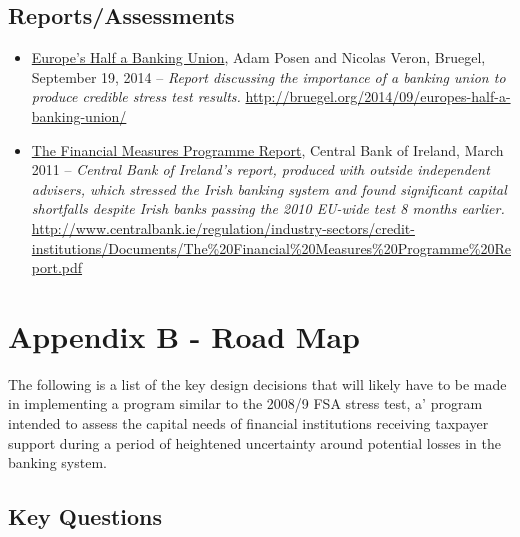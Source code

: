 \documentclass[12pt]{article}
\begin{document}
\subsection{Reports/Assessments}

\begin{itemize}
\item
\ul{Europe's Half a Banking Union}, Adam Posen and Nicolas Veron, Bruegel, September 19, 2014 -- \emph{Report discussing the importance of a banking union to produce credible stress test results.} \url{http://bruegel.org/2014/09/europes-half-a-banking-union/}
\item
\ul{The Financial Measures Programme Report}, Central Bank of Ireland, March 2011 -- \emph{Central Bank of Ireland's report, produced with outside independent advisers, which stressed the Irish banking system and found significant capital shortfalls despite Irish banks passing the 2010 EU-wide test 8 months earlier.} \url{http://www.centralbank.ie/regulation/industry-sectors/credit-institutions/Documents/The\%20Financial\%20Measures\%20Programme\%20Report.pdf}
\end{itemize}

\section{Appendix B - Road Map}

The following is a list of the key design decisions that will likely have to be made in implementing a program similar to the 2008/9 FSA stress test, a' program intended to assess the capital needs of financial institutions receiving taxpayer support during a period of heightened uncertainty around potential losses in the banking system.

\subsection{Key Questions}
\end{document}
